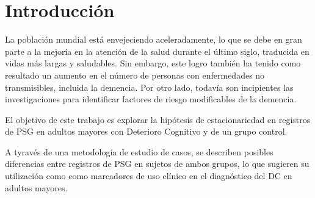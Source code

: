 \chapter{Introducci\'on}

La poblaci\'on mundial est\'a envejeciendo aceleradamente, lo que se debe en gran parte a la 
mejor\'ia en la atenci\'on de la salud durante el \'ultimo siglo, traducida en vidas m\'as 
largas y saludables. Sin embargo, este logro tambi\'en ha tenido como resultado un aumento en el 
n\'umero de personas con enfermedades no transmisibles, incluida la demencia.
Por otro lado, todav\'ia son incipientes las investigaciones para identificar 
factores de riesgo modificables de la demencia.
\cite{PlanAlzheimer04}



El objetivo de este trabajo es explorar la hip\'otesis de estacionariedad en registros
de PSG en adultos mayores con Deterioro Cognitivo y de
un grupo control.

A tyrav\'es de una metodolog\'ia de estudio de casos, se describen posibles diferencias entre 
registros 
de PSG en sujetos de ambos grupos, lo que sugieren su utilizaci\'on como
como marcadores de uso cl\'inico en el diagn\'ostico del DC en adultos mayores.

%
%
%


